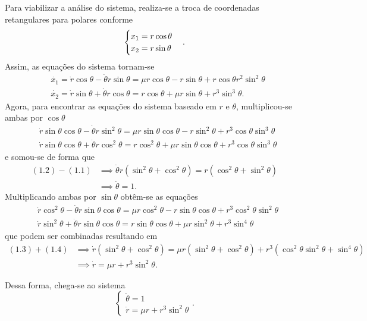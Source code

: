 \documentclass[a4paper]{report}
\begin{document}
Para viabilizar a análise do sistema, realiza-se a troca de coordenadas retangulares para polares conforme \[
    \begin{cases}
        x_1 = r\cos\theta \\
	x_2 = r\sin\theta
    \end{cases} \\
.\] Assim, as equações do sistema tornam-se 
\begin{align*}
    &\dot{x_1} = \dot{r}\cos\theta -\dot{\theta}r\sin\theta = \mu r\cos\theta - r\sin\theta +r\cos\theta r^2\sin^2\theta \\
    &\dot{x_2} = \dot{r}\sin\theta + \dot{\theta}r\cos\theta = r\cos\theta + \mu r\sin\theta + r^3\sin^3\theta
.\end{align*}
Agora, para encontrar as equações do sistema baseado em $r$ e $\theta$, multiplicou-se ambas por $\cos\theta$
\begin{align}
    & \dot{r}\sin\theta \cos\theta - \dot{\theta}r\sin^2\theta = \mu r\sin\theta\cos\theta -r\sin^2\theta + r^3\cos\theta\sin^3\theta \\
    & \dot{r}\sin\theta\cos\theta + \dot{\theta}r\cos^2\theta = r\cos^2\theta + \mu r\sin\theta \cos\theta + r^3\cos\theta\sin^3\theta
\end{align}
e somou-se de forma que
\begin{align*}
    (1.2) - (1.1) &\implies \dot{\theta}r \left( \sin^2\theta + \cos^2\theta \right) = r\left( \cos^2\theta + \sin^2\theta \right) \\
	      &\implies \dot{\theta} = 1
.\end{align*}
Multiplicando ambas por $\sin\theta$ obtêm-se as equações
\begin{align}
    & \dot{r}\cos^2\theta -\dot{\theta}r \sin\theta\cos\theta = \mu r \cos^2\theta - r\sin\theta\cos\theta + r^3\cos^2\theta\sin^2\theta \\
    & \dot{r}\sin^2\theta + \dot{\theta}r \sin\theta\cos\theta = r\sin\theta\cos\theta + \mu r \sin^2\theta + r^3\sin ^{4}\theta
\end{align}
que podem ser combinadas resultando em
\begin{align*}
    (1.3) + (1.4) &\implies \dot{r}\left( \sin^2\theta + \cos^2\theta \right) = \mu r \left( \sin^2\theta + \cos^2\theta \right) + r^3\left( \cos^2\theta\sin^2\theta + \sin^4\theta \right) \\
	      &\implies \dot{r} = \mu r + r^3\sin^2\theta
.\end{align*}

Dessa forma, chega-se ao sistema \[
\begin{cases}
    \dot{\theta} = 1 \\
    \dot{r} = \mu r + r^3\sin^2\theta
\end{cases}
.\] 
\end{document}
